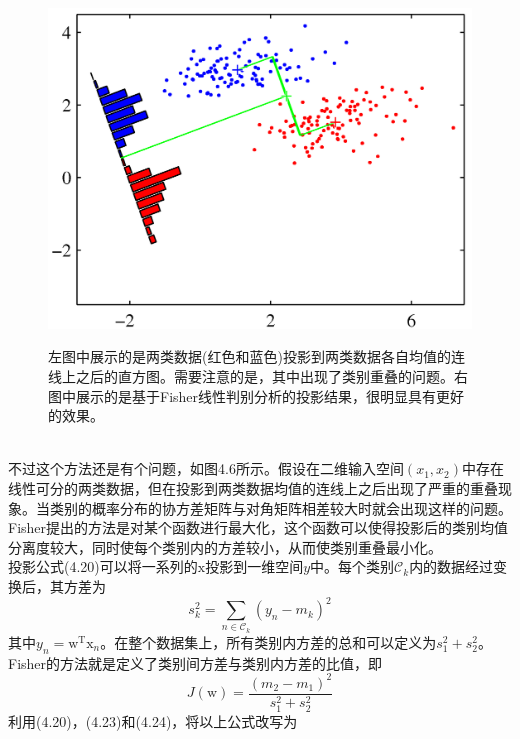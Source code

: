 \documentclass[b5paper]{book}
\numberwithin{equation}{chapter}
\newcommand {\bx} {\boldsymbol{\mathrm{x}}}
\newcommand {\bw} {\boldsymbol{\mathrm{w}}}
\newcommand {\rmT} {\mathrm{T}}
\begin{document}
{\begin{figure}[ht]
\begin{minipage}[t]{0.5\linewidth}
		\label{fig:4-6a}
		\end{minipage}
		\begin{minipage}[t]{0.5\linewidth}
		\centering
		\includegraphics[scale=0.8]{Images/4-6b.png}
		\label{fig:4-6b}
		\end{minipage}
		\caption{左图中展示的是两类数据(红色和蓝色)投影到两类数据各自均值的连线上之后的直方图。需要注意的是，其中出现了类别重叠的问题。右图中展示的是基于Fisher线性判别分析的投影结果，很明显具有更好的效果。}
	\end{figure}
	\\
	\indent 不过这个方法还是有个问题，如图4.6所示。假设在二维输入空间$(x_1,x_2)$中存在线性可分的两类数据，但在投影到两类数据均值的连线上之后出现了严重的重叠现象。当类别的概率分布的协方差矩阵与对角矩阵相差较大时就会出现这样的问题。Fisher提出的方法是对某个函数进行最大化，这个函数可以使得投影后的类别均值分离度较大，同时使每个类别内的方差较小，从而使类别重叠最小化。\\
	\indent 投影公式(4.20)可以将一系列的$\bx$投影到一维空间$y$中。每个类别$\mathcal{C}_k$内的数据经过变换后，其方差为
	\begin{equation}
		s_k^2 = \sum_{n \in \mathcal{C}_k}(y_n - m_k)^2
	\end{equation}
	其中$y_n = \bw^{\rmT} \bx_n$。在整个数据集上，所有类别内方差的总和可以定义为$s_1^2 + s_2^2$。Fisher的方法就是定义了类别间方差与类别内方差的比值，即
	\begin{equation}
		J(\bw)=\frac{(m_2-m_1)^2}{s_1^2 + s_2^2}
	\end{equation}
	利用(4.20)，(4.23)和(4.24)，将以上公式改写为
	\begin{equation}

\end{equation}}
\end{document}

